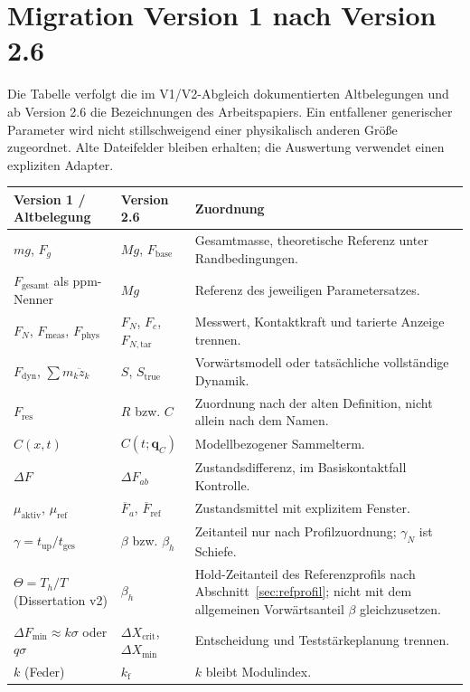 \documentclass[11pt,a4paper]{article}
\begin{document}
\section{Migration Version 1 nach Version 2.6}\label{app:migration}
Die Tabelle verfolgt die im V1/V2-Abgleich dokumentierten Altbelegungen und ab Version 2.6 die Bezeichnungen des Arbeitspapiers. Ein entfallener generischer Parameter wird nicht stillschweigend einer physikalisch anderen Größe zugeordnet. Alte Dateifelder bleiben erhalten; die Auswertung verwendet einen expliziten Adapter.
\begin{longtable}{@{}L{.27\textwidth}L{.28\textwidth}L{.40\textwidth}@{}}
\toprule\textbf{Version 1 / Altbelegung}&\textbf{Version 2.6}&\textbf{Zuordnung}\\\midrule\endhead
$mg$, $F_g$&$Mg$, $F_{\mathrm{base}}$&Gesamtmasse, theoretische Referenz unter Randbedingungen.\\
$F_{\mathrm{gesamt}}$ als ppm-Nenner&$Mg$&Referenz des jeweiligen Parametersatzes.\\
$F_N$, $F_{\mathrm{meas}}$, $F_{\mathrm{phys}}$&$F_N$, $F_c$, $F_{N,\mathrm{tar}}$&Messwert, Kontaktkraft und tarierte Anzeige trennen.\\
$F_{\mathrm{dyn}}$, $\sum m_k\ddot z_k$&$S$, $S_{\mathrm{true}}$&Vorwärtsmodell oder tatsächliche vollständige Dynamik.\\
$F_{\mathrm{res}}$&$R$ bzw. $C$&Zuordnung nach der alten Definition, nicht allein nach dem Namen.\\
$C(x,t)$&$C(t;\mathbf q_C)$&Modellbezogener Sammelterm.\\
$\Delta F$&$\Delta F_{ab}$&Zustandsdifferenz, im Basiskontaktfall Kontrolle.\\
$\mu_{\mathrm{aktiv}}$, $\mu_{\mathrm{ref}}$&$\overline F_a$, $\overline F_{\mathrm{ref}}$&Zustandsmittel mit explizitem Fenster.\\
$\gamma=t_{\mathrm{up}}/t_{\mathrm{ges}}$&$\beta$ bzw. $\beta_h$&Zeitanteil nur nach Profilzuordnung; $\gamma_N$ ist Schiefe.\\
$\Theta=T_h/T$ (Dissertation v2)&$\beta_h$&Hold-Zeitanteil des Referenzprofils nach Abschnitt~\ref{sec:refprofil}; nicht mit dem allgemeinen Vorwärtsanteil $\beta$ gleichzusetzen.\\
$\Delta F_{\min}\approx k\sigma$ oder $q\sigma$&$\Delta X_{\mathrm{crit}}$, $\Delta X_{\min}$&Entscheidung und Teststärkeplanung trennen.\\
$k$ (Feder)&$k_{\mathrm f}$&$k$ bleibt Modulindex.\\

\end{longtable}
\end{document}
